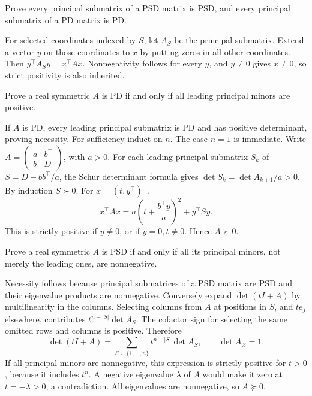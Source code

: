 \begin{problem}\label{ex:09:principal}
Prove every principal submatrix of a PSD matrix is PSD, and every
principal submatrix of a PD matrix is PD.
\end{problem}
\begin{solution}
For selected coordinates indexed by \(S\), let \(A_S\) be the principal
submatrix. Extend a vector \(y\) on those coordinates to \(x\) by
putting zeros in all other coordinates. Then \(y^\top A_Sy=x^\top Ax\).
Nonnegativity follows for every \(y\), and \(y\ne0\) gives \(x\ne0\),
so strict positivity is also inherited.
\end{solution}

\begin{problem}\label{ex:09:leading-minors}
Prove a real symmetric \(A\) is PD if and only if all leading principal
minors are positive.
\end{problem}
\begin{solution}
If \(A\) is PD, every leading principal submatrix is PD and has positive
determinant, proving necessity.
For sufficiency induct on \(n\). The case \(n=1\) is immediate.
Write \(A=\begin{pmatrix}a&b^\top\\b&D\end{pmatrix}\), with \(a>0\).
For each leading principal submatrix \(S_k\) of
\(S=D-bb^\top/a\), the Schur determinant formula gives
\(\det S_k=\det A_{k+1}/a>0\).
By induction \(S\succ0\).
For \(x=(t,y^\top)^\top\),
\[
 x^\top Ax=a\left(t+\frac{b^\top y}{a}\right)^2+y^\top Sy.
\]
This is strictly positive if \(y\ne0\), or if \(y=0,t\ne0\).
Hence \(A\succ0\).
\end{solution}

\begin{problem}\label{ex:09:all-minors}
Prove a real symmetric \(A\) is PSD if and only if all its principal
minors, not merely the leading ones, are nonnegative.
\end{problem}
\begin{solution}
Necessity follows because principal submatrices of a PSD matrix are PSD
and their eigenvalue products are nonnegative.
Conversely expand \(\det(tI+A)\) by multilinearity in the columns.
Selecting columns from \(A\) at positions in \(S\), and \(te_j\)
elsewhere, contributes \(t^{n-|S|}\det A_S\).
The cofactor sign for selecting the same omitted rows and columns is
positive. Therefore
\[
 \det(tI+A)=\sum_{S\subseteq\{1,\ldots,n\}}t^{n-|S|}\det A_S,
 \qquad \det A_\varnothing=1.
\]
If all principal minors are nonnegative, this expression is strictly
positive for \(t>0\), because it includes \(t^n\).
A negative eigenvalue \(\lambda\) of \(A\) would make it zero at
\(t=-\lambda>0\), a contradiction.
All eigenvalues are nonnegative, so \(A\succeq0\).
\end{solution}

